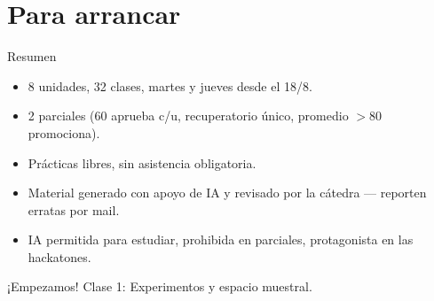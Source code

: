 \documentclass[aspectratio=169,11pt]{beamer}
\begin{document}
\section{Para arrancar}

\begin{frame}{Resumen}
\begin{itemize}\small
\item 8 unidades, 32 clases, martes y jueves desde el 18/8.
\item 2 parciales (60 aprueba c/u, recuperatorio único, promedio $>80$ promociona).
\item Prácticas libres, sin asistencia obligatoria.
\item Material generado con apoyo de IA y revisado por la cátedra — reporten erratas por mail.
\item IA permitida para estudiar, prohibida en parciales, protagonista en las hackatones.
\end{itemize}

\vspace{0.8em}
\begin{center}
\Large ¡Empezamos! Clase 1: Experimentos y espacio muestral.
\end{center}
\end{frame}
\end{document}
